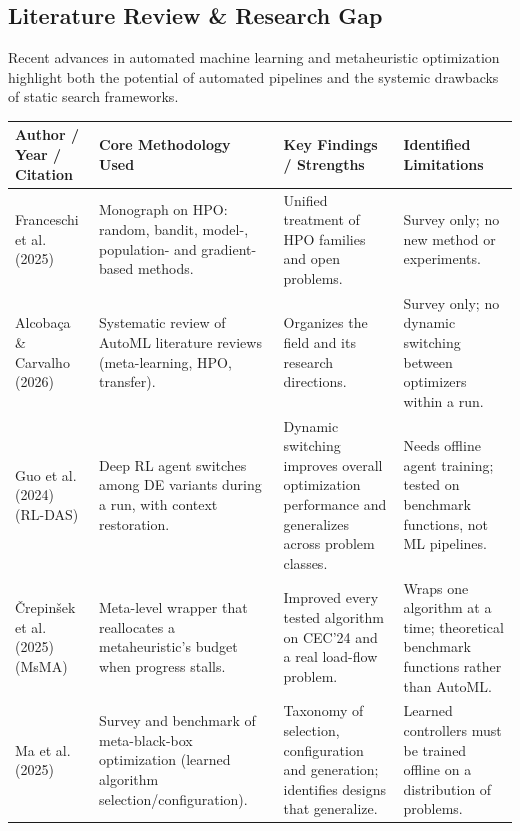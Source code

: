 \documentclass[11pt, a4paper]{article}
\begin{document}
\subsection{Literature Review \& Research Gap}
\noindent
Recent advances in automated machine learning and metaheuristic optimization highlight both the potential of automated pipelines and the systemic drawbacks of static search frameworks.

\begin{table}[H]
    \centering
    \footnotesize
    \renewcommand{\arraystretch}{1.25}
    \begin{tabular}{|p{3.2cm}|p{4.2cm}|p{4.0cm}|p{3.8cm}|}
        \hline
        \textbf{Author / Year / Citation} & \textbf{Core Methodology Used} & \textbf{Key Findings / Strengths} & \textbf{Identified Limitations} \\
        \hline
        Franceschi et al. (2025) \cite{franceschi2025hyperparameter} & Monograph on HPO: random, bandit, model-, population- and gradient-based methods. & Unified treatment of HPO families and open problems. & Survey only; no new method or experiments. \\
        \hline
        Alcoba\c{c}a \& Carvalho (2026) \cite{alcobaca2026literature} & Systematic review of AutoML literature reviews (meta-learning, HPO, transfer). & Organizes the field and its research directions. & Survey only; no dynamic switching between optimizers within a run. \\
        \hline
        Guo et al. (2024) \cite{guo2024deep} (RL-DAS) & Deep RL agent switches among DE variants during a run, with context restoration. & Dynamic switching improves overall optimization performance and generalizes across problem classes. & Needs offline agent training; tested on benchmark functions, not ML pipelines. \\
        \hline
        \v{C}repin\v{s}ek et al. (2025) \cite{crepinsek2025overcoming} (MsMA) & Meta-level wrapper that reallocates a metaheuristic's budget when progress stalls. & Improved every tested algorithm on CEC'24 and a real load-flow problem. & Wraps one algorithm at a time; theoretical benchmark functions rather than AutoML. \\
        \hline
        Ma et al. (2025) \cite{ma2025toward} & Survey and benchmark of meta-black-box optimization (learned algorithm selection/configuration). & Taxonomy of selection, configuration and generation; identifies designs that generalize. & Learned controllers must be trained offline on a distribution of problems. \\

\end{tabular}
\end{table}
\end{document}
